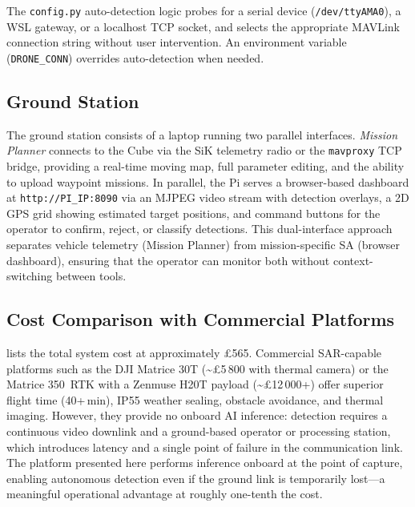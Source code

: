 The \texttt{config.py} auto-detection logic probes for a serial device (\texttt{/dev/ttyAMA0}), a WSL gateway, or a localhost TCP socket, and selects the appropriate MAVLink connection string without user intervention. An environment variable (\texttt{DRONE\_CONN}) overrides auto-detection when needed.


\subsection{Ground Station}\label{sec:hw-gs}

The ground station consists of a laptop running two parallel interfaces. \textit{Mission Planner} \cite{missionplanner2024} connects to the Cube via the SiK telemetry radio or the \texttt{mavproxy} TCP bridge, providing a real-time moving map, full parameter editing, and the ability to upload waypoint missions. In parallel, the Pi serves a browser-based dashboard at \texttt{http://PI\_IP:8090} via an MJPEG video stream with detection overlays, a 2D GPS grid showing estimated target positions, and command buttons for the operator to confirm, reject, or classify detections. This dual-interface approach separates vehicle telemetry (Mission Planner) from mission-specific SA (browser dashboard), ensuring that the operator can monitor both without context-switching between tools.


\subsection{Cost Comparison with Commercial Platforms}\label{sec:hw-cost}

 lists the total system cost at approximately \pounds565. Commercial SAR-capable platforms such as the DJI Matrice 30T (\textasciitilde\pounds5\,800 with thermal camera) or the Matrice 350~RTK with a Zenmuse H20T payload (\textasciitilde\pounds12\,000+) offer superior flight time (40+\,min), IP55 weather sealing, obstacle avoidance, and thermal imaging. However, they provide no onboard AI inference: detection requires a continuous video downlink and a ground-based operator or processing station, which introduces latency and a single point of failure in the communication link. The platform presented here performs inference onboard at the point of capture, enabling autonomous detection even if the ground link is temporarily lost---a meaningful operational advantage at roughly one-tenth the cost.
